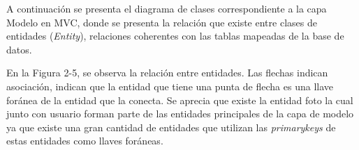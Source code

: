 \documentclass{memoria}
\begin{document}
A continuación se presenta el diagrama de clases correspondiente a la capa Modelo en MVC, donde se presenta la relación que existe entre clases de entidades (\textsl{Entity}), relaciones coherentes con las tablas mapeadas de la base de datos.


En la Figura 2-5, se observa la relación entre entidades. Las flechas indican asociación, indican que la entidad que tiene una punta de flecha es una llave foránea de la entidad que la conecta. Se aprecia que existe la entidad foto la cual junto con usuario forman parte de las entidades principales de la capa de modelo ya que existe una gran cantidad de entidades que utilizan las \textsl{primarykeys} de estas entidades como llaves foráneas.

\end{document}
